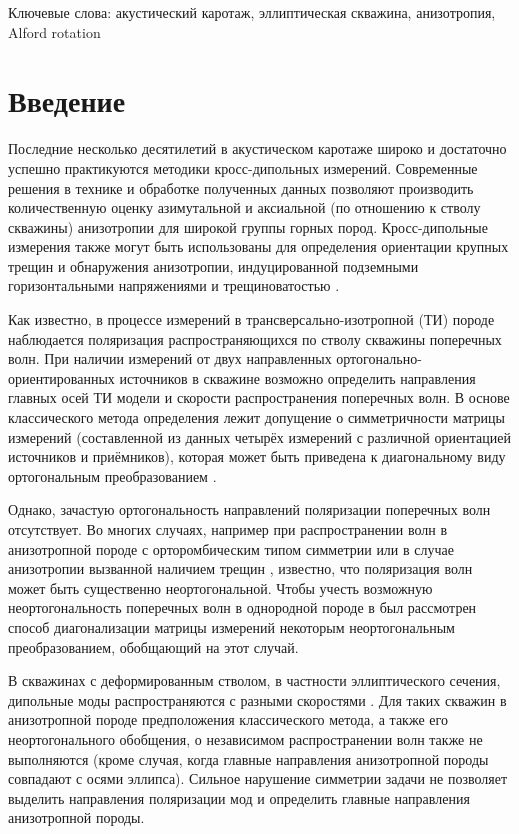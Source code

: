 \documentclass[a4paper,11pt]{article}
\begin{document}
Ключевые слова: акустический каротаж, эллиптическая скважина, анизотропия, Alford rotation
\par

\section{Введение}
Последние несколько десятилетий в акустическом каротаже широко и достаточно успешно практикуются методики кросс-дипольных измерений. Современные решения в технике и обработке полученных данных позволяют производить количественную оценку азимутальной и аксиальной (по отношению к стволу скважины) анизотропии для широкой группы горных пород. Кросс-дипольные измерения также могут быть использованы для определения ориентации крупных трещин и обнаружения анизотропии, индуцированной подземными горизонтальными напряжениями и трещиноватостью \cite{Patterson2001}.

Как известно, в процессе измерений в трансверсально-изотропной (ТИ) породе наблюдается поляризация распространяющихся по стволу скважины поперечных волн. При наличии измерений от двух направленных ортогонально-ориентированных источников в скважине возможно определить направления главных осей ТИ модели и скорости распространения поперечных волн. В основе классического метода определения лежит допущение о симметричности матрицы измерений (составленной из данных четырёх измерений с различной ориентацией источников и приёмников), которая может быть приведена к диагональному виду ортогональным преобразованием \cite{Alford1986}. 

Однако, зачастую ортогональность направлений поляризации поперечных волн отсутствует. Во многих случаях, например при распространении волн в анизотропной породе с орторомбическим типом симметрии \cite{Dellinger2001} или в случае анизотропии вызванной наличием трещин \cite{Nolte1996}, известно, что поляризация волн может быть существенно неортогональной. Чтобы учесть возможную неортогональность поперечных волн в однородной породе в \cite{Dellinger1998} был рассмотрен способ диагонализации матрицы измерений некоторым неортогональным преобразованием, обобщающий \cite{Alford1986} на этот случай. 

В скважинах с деформированным стволом, в частности эллиптического сечения, дипольные моды распространяются с разными скоростями \cite{Seroices2010}. Для таких скважин в анизотропной породе предположения классического метода, а также его неортогонального обобщения, о независимом распространении волн также не выполняются (кроме случая, когда главные направления анизотропной породы совпадают с осями эллипса). Сильное нарушение симметрии задачи не позволяет выделить направления поляризации мод и определить главные направления анизотропной породы. 
\end{document}
